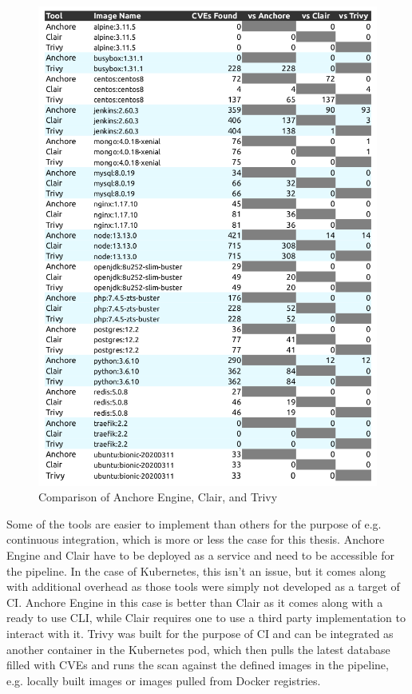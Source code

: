 \begin{figure}[H]
    \centering
    \includegraphics[scale=0.5]{graphics/Docker-Image-Static-Analysis-Tool-Comparison-Table.png}
    \caption{Comparison of Anchore Engine, Clair, and Trivy}
    \label{fig:docker_comparison}
\end{figure}

Some of the tools are easier to implement than others for the purpose of e.g. continuous integration, which is more or less the case for this thesis. Anchore Engine and Clair have to be deployed as a service and need to be accessible for the pipeline. In the case of Kubernetes, this isn't an issue, but it comes along with additional overhead as those tools were simply not developed as a target of CI. Anchore Engine in this case is better than Clair as it comes along with a ready to use CLI, while Clair requires one to use a third party implementation to interact with it. Trivy was built for the purpose of CI and can be integrated as another container in the Kubernetes pod, which then pulls the latest database filled with CVEs and runs the scan against the defined images in the pipeline, e.g. locally built images or images pulled from Docker registries.

